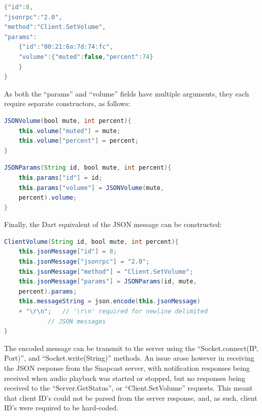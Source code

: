 \documentclass[11pt,a4paper,headinclude=false,footinclude=false]{scrreprt}
\begin{document}
\lstset{
    caption=Example Snapcast "Client.SetVolume" Request,
    basicstyle=\footnotesize, frame=tb,
    xleftmargin=.2\textwidth, xrightmargin=.2\textwidth
}

\begin{lstlisting}[language=Java]
{"id":8,
"jsonrpc":"2.0",
"method":"Client.SetVolume",
"params":
    {"id":"00:21:6a:7d:74:fc",
    "volume":{"muted":false,"percent":74}
    }
}
\end{lstlisting}

As both the ``params'' and ``volume'' fields have multiple arguments,
they each require separate constructors, as follows:

\lstset{
    caption=Dart JSON "volume" Field Constructor,
    basicstyle=\footnotesize, frame=tb,
    xleftmargin=.2\textwidth, xrightmargin=.2\textwidth
}

\begin{lstlisting}[language=Java]
JSONVolume(bool mute, int percent){
    this.volume["muted"] = mute;
    this.volume["percent"] = percent;
}
\end{lstlisting}

\lstset{
    caption=Dart JSON "params" Field Constructor,
    basicstyle=\footnotesize, frame=tb,
    xleftmargin=.2\textwidth, xrightmargin=.2\textwidth
}

\begin{lstlisting}[language=Java]
JSONParams(String id, bool mute, int percent){
    this.params["id"] = id;
    this.params["volume"] = JSONVolume(mute,
    percent).volume;
}
\end{lstlisting}

Finally, the Dart equivalent of the JSON message can be constructed:

\lstset{
    caption=Dart JSON Client.SetVolume Constructor,
    basicstyle=\footnotesize, frame=tb,
    xleftmargin=.2\textwidth, xrightmargin=.2\textwidth
}

\begin{lstlisting}[language=Java]
ClientVolume(String id, bool mute, int percent){
    this.jsonMessage["id"] = 8;
    this.jsonMessage["jsonrpc"] = "2.0";
    this.jsonMessage["method"] = "Client.SetVolume";
    this.jsonMessage["params"] = JSONParams(id, mute,
    percent).params;
    this.messageString = json.encode(this.jsonMessage)
    + "\r\n";   // '\r\n' required for newline delimited
            // JSON messages
}
\end{lstlisting}

The encoded message can be transmit to the server using the
``Socket.connect(IP, Port)'', and ``Socket.write(String)'' methods. An
issue arose however in receiving the JSON response from the Snapcast
server, with notification responses being received when audio playback
was started or stopped, but no responses being received to the
``Server.GetStatus'', or ``Client.SetVolume'' requests. This meant that
client ID's could not be parsed from the server response, and, as such,
client ID's were required to be hard-coded.
\end{document}
